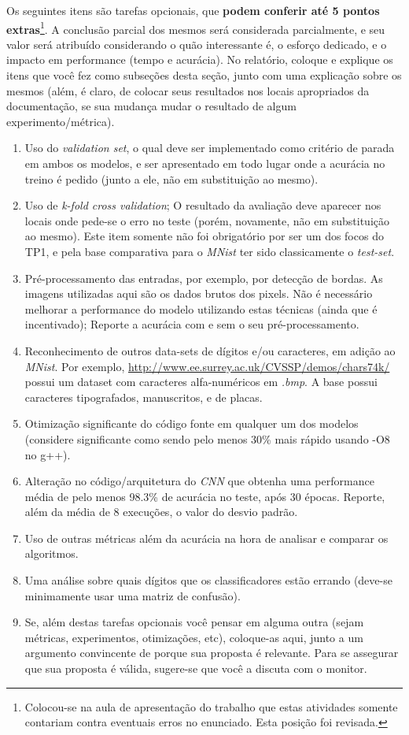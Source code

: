 \documentclass[12pt, a4paper]{article}
\begin{document}
Os seguintes itens são tarefas opcionais, que \textbf{podem conferir até 5 pontos extras}\footnote{Colocou-se na aula de apresentação do trabalho que estas atividades somente contariam contra eventuais erros no enunciado. Esta posição foi revisada.}. A conclusão parcial dos mesmos será considerada parcialmente, e seu valor será atribuído considerando o quão interessante é, o esforço dedicado, e o impacto em performance (tempo e acurácia). No relatório, coloque e explique os itens que você fez como subseções desta seção, junto com uma explicação sobre os mesmos (além, é claro, de colocar seus resultados nos locais apropriados da documentação, se sua mudança mudar o resultado de algum experimento/métrica).
\begin{enumerate}
\item Uso do \emph{validation set}, o qual deve ser implementado como critério de parada em ambos os modelos, e ser apresentado em todo lugar onde a acurácia no treino é pedido (junto a ele, não em substituição ao mesmo).
\item Uso de \emph{k-fold cross validation}; O resultado da avaliação deve aparecer nos locais onde pede-se o erro no teste (porém, novamente, não em substituição ao mesmo). Este item somente não foi obrigatório por ser um dos focos do TP1, e pela base comparativa para o \emph{MNist} ter sido classicamente o \emph{test-set}.
\item Pré-processamento das entradas, por exemplo, por detecção de bordas. As imagens utilizadas aqui são os dados brutos dos pixels. Não é necessário melhorar a performance do modelo utilizando estas técnicas (ainda que é incentivado); Reporte a acurácia com e sem o seu pré-processamento.
\item Reconhecimento de outros data-sets de dígitos e/ou caracteres, em adição ao \emph{MNist}. Por exemplo, \url{http://www.ee.surrey.ac.uk/CVSSP/demos/chars74k/} possui um dataset com caracteres alfa-numéricos em \emph{.bmp}. A base possui caracteres tipografados, manuscritos, e de placas.
\item Otimização significante do código fonte em qualquer um dos modelos (considere significante como sendo pelo menos 30\% mais rápido usando -O8 no g++).
\item Alteração no código/arquitetura do \emph{CNN} que obtenha uma performance média de pelo menos 98.3\% de acurácia no teste, após 30 épocas. Reporte, além da média de 8 execuções, o valor do desvio padrão.
\item Uso de outras métricas além da acurácia na hora de analisar e comparar os algoritmos.
\item Uma análise sobre quais dígitos que os classificadores estão errando (deve-se minimamente usar uma matriz de confusão).
\item Se, além destas tarefas opcionais você pensar em alguma outra (sejam métricas, experimentos, otimizações, etc), coloque-as aqui, junto a um argumento convincente de porque sua proposta é relevante. Para se assegurar que sua proposta é válida, sugere-se que você a discuta com o monitor.
\end{enumerate}
\end{document}

